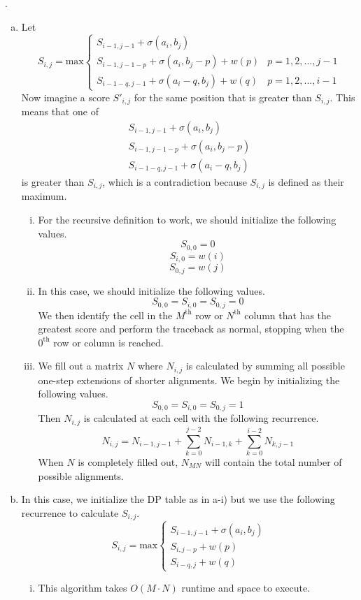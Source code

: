 \documentclass[a4paper, 10pt]{article}
\newcounter{prob_num}
\newcommand{\problem}{\vspace{20pt}\arabic{prob_num}.\stepcounter{prob_num}\par}
\begin{document}
\problem

\begin{enumerate}[(a)]
  \item Let
\[ S_{i,j} = \text{max} \left\{
  \begin{array}{lr}
    S_{i-1, j-1}+\sigma(a_i, b_j) & \\
    S_{i-1, j-1-p}+\sigma(a_i, b_j-p) + w(p) & p = 1,2,...,j-1 \\
    S_{i-1-q, j-1}+\sigma(a_i-q, b_j) + w(q) & p = 1,2,...,i-1
  \end{array}
  \right.
\] Now imagine a score $S'_{i,j}$ for the same position that is greater than $S_{i,j}$. This means that one of
\[
  \begin{array}{l}
    S_{i-1, j-1}+\sigma(a_i, b_j)     \\
    S_{i-1, j-1-p}+\sigma(a_i, b_j-p) \\
    S_{i-1-q, j-1}+\sigma(a_i-q, b_j)
  \end{array}
\] is greater than $S_{i,j}$, which is a contradiction because $S_{i,j}$ is defined as their maximum.

  \begin{enumerate}[(i)]
    \item For the recursive definition to work, we should initialize the following values. \[ S_{0,0}=0 \]\[ S_{i,0}=w(i) \]\[ S_{0,j}=w(j) \]
    \item In this case, we should initialize the following values. \[ S_{0,0} = S_{i,0} = S_{0,j} = 0 \] We then identify the cell in the $M^{\text{th}}$ row or $N^{\text{th}}$ column that has the greatest score and perform the traceback as normal, stopping when the $0^{\text{th}}$ row or column is reached.
    \item We fill out a matrix $N$ where $N_{i,j}$ is calculated by summing all possible one-step extensions of shorter alignments. We begin by initializing the following values. \[ S_{0,0} = S_{i,0} = S_{0,j} = 1 \] Then $N_{i,j}$ is calculated at each cell with the following recurrence. \[ N_{i,j} = N_{i-1,j-1} + \sum_{k=0}^{j-2}N_{i-1, k} + \sum_{k=0}^{i-2}N_{k, j-1} \] When $N$ is completely filled out, $N_{MN}$ will contain the total number of possible alignments.
  \end{enumerate}
  \item In this case, we initialize the DP table as in a-i) but we use the following recurrence to calculate $S_{i,j}$.
\[ S_{i,j} = \text{max} \left\{
  \begin{array}{lr}
    S_{i-1, j-1}+\sigma(a_i, b_j) \\
    S_{i, j-p}+w(p)               \\
    S_{i-q, j}+w(q)
  \end{array}
  \right.
\]
  \begin{enumerate}[(i)]
    \item This algorithm takes $O(M \cdot N)$ runtime and space to execute.
  \end{enumerate}
\end{enumerate}
\end{document}
